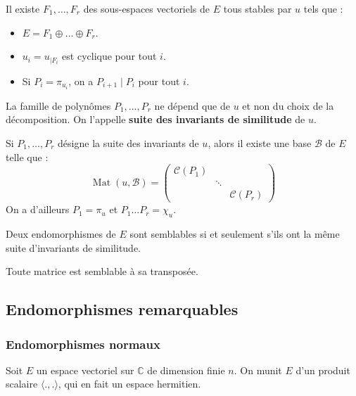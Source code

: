 	\begin{theorem}
		Il existe $F_1, \dots, F_r$ des sous-espaces vectoriels de $E$ tous stables par $u$ tels que :
		\begin{itemize}
			\item $E = F_1 \oplus \dots \oplus F_r$.
			\item $u_i = u_{|F_i}$ est cyclique pour tout $i$.
			\item Si $P_i = \pi_{u_i}$, on a $P_{i+1} \mid P_i$ pour tout $i$.
		\end{itemize}
		La famille de polynômes $P_1, \dots, P_r$ ne dépend que de $u$ et non du choix de la décomposition. On l'appelle \textbf{suite des invariants de similitude} de $u$.
	\end{theorem}
	
	\begin{theorem}
		Si $P_1, \dots, P_r$ désigne la suite des invariants de $u$, alors il existe une base $\mathcal{B}$ de $E$ telle que :
		\[ \operatorname{Mat}(u, \mathcal{B}) = \begin{pmatrix} \mathcal{C}(P_1) & & \\ & \ddots & \\ & & \mathcal{C}(P_r) \end{pmatrix} \]
		On a d'ailleurs $P_1 = \pi_u$ et $P_1 \dots P_r = \chi_u$.
	\end{theorem}
	
	\begin{corollary}
		Deux endomorphismes de $E$ sont semblables si et seulement s'ils ont la même suite d'invariants de similitude.
	\end{corollary}
	
	\begin{application}
		Toute matrice est semblable à sa transposée.
	\end{application}
	
	\subsection{Endomorphismes remarquables}
	
	\subsubsection{Endomorphismes normaux}
	
	Soit $E$ un espace vectoriel sur $\mathbb{C}$ de dimension finie $n$. On munit $E$ d'un produit scalaire $\langle . , . \rangle$, qui en fait un espace hermitien.
	
